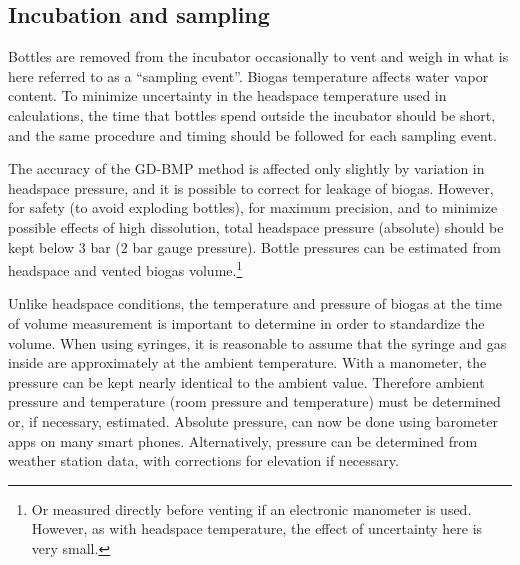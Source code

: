 \documentclass[]{article}
\begin{document}
\subsection{Incubation and sampling}
Bottles are removed from the incubator occasionally to vent and weigh in what is here referred to as a ``sampling event''. 
Biogas temperature affects water vapor content. 
To minimize uncertainty in the headspace temperature used in calculations, the time that bottles spend outside the incubator should be short, and the same procedure and timing should be followed for each sampling event. 

The accuracy of the GD-BMP method is affected only slightly by variation in headspace pressure, and it is possible to correct for leakage of biogas. 
However, for safety (to avoid exploding bottles), for maximum precision, and to minimize possible effects of high  dissolution, total headspace pressure (absolute) should be kept below 3 bar (2 bar gauge pressure). 
Bottle pressures can be estimated from headspace and vented biogas volume.\footnote{
  Or measured directly before venting if an electronic manometer is used.
  However, as with headspace temperature, the effect of uncertainty here is very small.
}

Unlike headspace conditions, the temperature and pressure of biogas at the time of volume measurement is important to determine in order to standardize the volume.
When using syringes, it is reasonable to assume that the syringe and gas inside are approximately at the ambient temperature.
With a manometer, the pressure can be kept nearly identical to the ambient value.
Therefore ambient pressure and temperature (room pressure and temperature) must be determined or, if necessary, estimated.
Absolute pressure, can now be done using barometer apps on many smart phones.
Alternatively, pressure can be determined from weather station data, with corrections for elevation if necessary.
\end{document}
